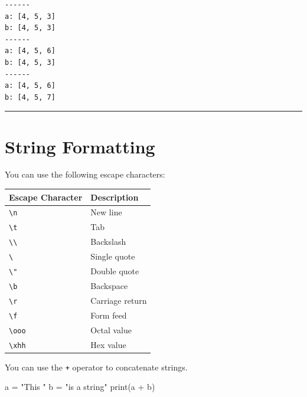 \documentclass[
  letterpaper,
  DIV=11,
  numbers=noendperiod]{scrreprt}
\newenvironment{Shaded}{\begin{snugshade}}{\end{snugshade}}
\newcommand{\BuiltInTok}[1]{\textcolor[rgb]{0.00,0.23,0.31}{#1}}
\newcommand{\NormalTok}[1]{\textcolor[rgb]{0.00,0.23,0.31}{#1}}
\newcommand{\OperatorTok}[1]{\textcolor[rgb]{0.37,0.37,0.37}{#1}}
\newcommand{\StringTok}[1]{\textcolor[rgb]{0.13,0.47,0.30}{#1}}
\begin{document}
\begin{verbatim}
------
a: [4, 5, 3]
b: [4, 5, 3]
------
a: [4, 5, 6]
b: [4, 5, 3]
------
a: [4, 5, 6]
b: [4, 5, 7]
\end{verbatim}

\begin{center}\rule{0.5\linewidth}{0.5pt}\end{center}

\chapter*{String Formatting}\label{string-formatting}


You can use the following escape characters:

\begin{longtable}[]{@{}ll@{}}
\toprule\noalign{}
Escape Character & Description \\
\midrule\noalign{}
\endhead
\bottomrule\noalign{}
\endlastfoot
\texttt{\textbackslash{}n} & New line \\
\texttt{\textbackslash{}t} & Tab \\
\texttt{\textbackslash{}\textbackslash{}} & Backslash \\
\texttt{\textbackslash{}\textquotesingle{}} & Single quote \\
\texttt{\textbackslash{}"} & Double quote \\
\texttt{\textbackslash{}b} & Backspace \\
\texttt{\textbackslash{}r} & Carriage return \\
\texttt{\textbackslash{}f} & Form feed \\
\texttt{\textbackslash{}ooo} & Octal value \\
\texttt{\textbackslash{}xhh} & Hex value \\
\end{longtable}

You can use the \texttt{+} operator to concatenate strings.

\begin{Shaded}
\begin{Highlighting}[]
\NormalTok{a }\OperatorTok{=} \StringTok{"This "} 
\NormalTok{b }\OperatorTok{=} \StringTok{"is a string"}
\BuiltInTok{print}\NormalTok{(a }\OperatorTok{+}\NormalTok{ b)}
\end{Highlighting}
\end{Shaded}
\end{document}

